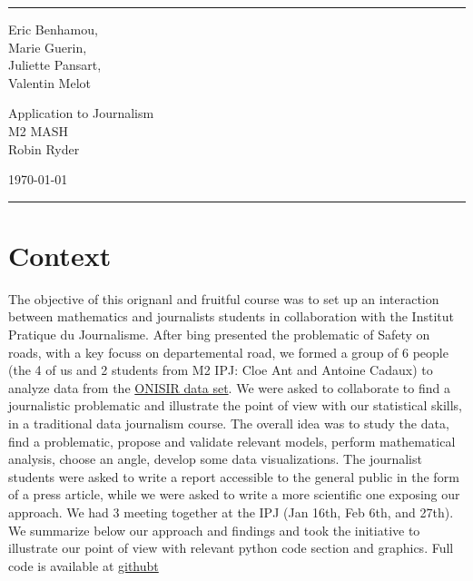 \documentclass[a4paper]{article}
\begin{document}

\fancyhead[C]{}
\hrule \medskip %
\begin{minipage}{0.295\textwidth} 
\raggedright
\footnotesize
Eric Benhamou, \hfill\\   
Marie Guerin, \hfill\\   
Juliette Pansart, \hfill\\
Valentin Melot  \hfill\\
\end{minipage}
\begin{minipage}{0.4\textwidth} 
\centering 
\large 
Application to Journalism\\ 
\normalsize 
M2 MASH \\ 
Robin Ryder
\end{minipage}
\begin{minipage}{0.295\textwidth} 
\raggedleft
\today\hfill\\
\end{minipage}
\medskip\hrule 
\bigskip


\section{Context}
The objective of this orignanl and fruitful course was to set up an interaction between mathematics and journalists students in collaboration with the Institut Pratique du Journalisme. After bing presented the problematic of Safety on roads, with a key focuss on departemental road, we formed a group of 6 people (the 4 of us and 2 students from M2 IPJ: Cloe Ant and Antoine Cadaux) to analyze data from the \href{https://www.data.gouv.fr/fr/datasets/base-de-donnees-accidents-corporels-de-la-circulation/}{ONISIR data set}. We were asked to collaborate to find a journalistic problematic and illustrate the point of view with our statistical skills, in a traditional data journalism course. The overall idea was to study the data, find a problematic, propose and validate relevant models, perform mathematical analysis, choose an angle, develop some data visualizations. The journalist students were asked to write a report accessible to the general public in the form of a press article, while we were asked to write a more scientific one exposing our approach. We had 3 meeting together at the IPJ (Jan 16th, Feb 6th, and 27th). We summarize below our approach and findings and took the initiative to illustrate our point of view with relevant python code section and graphics. Full code is available at \href{https://github.com/ericbenhamou/MASH_IPJ_2018}{githubt}
\end{document}

